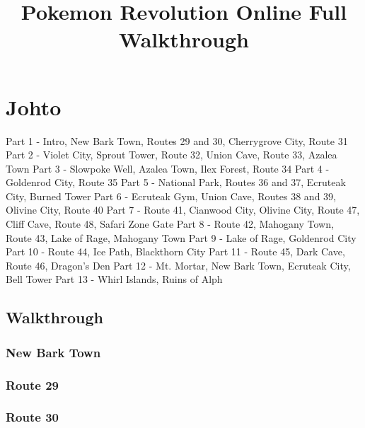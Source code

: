 \documentclass[11pt]{article}
\title{Pokemon Revolution Online Full Walkthrough}
\begin{document}
\pagecolor{LightColor}

\maketitle

\tableofcontents

\section{Johto}\label{sec:johto}

Part 1 - Intro, New Bark Town, Routes 29 and 30, Cherrygrove City, Route 31
Part 2 - Violet City, Sprout Tower, Route 32, Union Cave, Route 33, Azalea Town
Part 3 - Slowpoke Well, Azalea Town, Ilex Forest, Route 34
Part 4 - Goldenrod City, Route 35
Part 5 - National Park, Routes 36 and 37, Ecruteak City, Burned Tower
Part 6 - Ecruteak Gym, Union Cave, Routes 38 and 39, Olivine City, Route 40
Part 7 - Route 41, Cianwood City, Olivine City, Route 47, Cliff Cave, Route 48, Safari Zone Gate
Part 8 - Route 42, Mahogany Town, Route 43, Lake of Rage, Mahogany Town
Part 9 - Lake of Rage, Goldenrod City
Part 10 - Route 44, Ice Path, Blackthorn City
Part 11 - Route 45, Dark Cave, Route 46, Dragon's Den
Part 12 - Mt. Mortar, New Bark Town, Ecruteak City, Bell Tower
Part 13 - Whirl Islands, Ruins of Alph

\subsection{Walkthrough}\label{subsec:walkthrough}

\subsubsection{New Bark Town}%
\label{ssubsec:NewBarkTown}%

%
%
\subsubsection{Route 29}%
\label{ssubsec:Route29}%

%
%
%
%
\subsubsection{Route 30}%
\label{ssubsec:Route30}%
\end{document}
